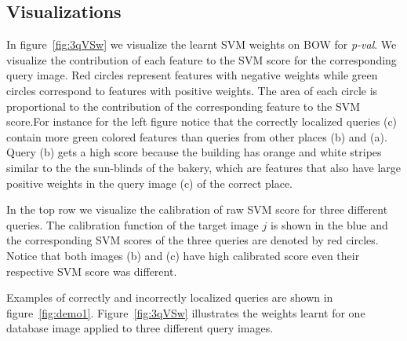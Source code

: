   \subsection{Visualizations}
    

    In figure~\ref{fig:3qVSw} we visualize the learnt SVM weights on BOW for \emph{p-val}. We visualize the contribution of each feature to the SVM score for the corresponding query image. Red circles represent features with negative weights while green circles correspond to features with positive weights. The area of each circle is proportional to the contribution of the corresponding feature to the SVM score.For instance for the left figure notice that the correctly localized queries (c) contain more green colored features than queries from other places (b) and (a). Query (b) gets a high score because the building has orange and white stripes similar to the the sun-blinds of the bakery, which are features that also have large positive weights in the query image (c) of the correct place.

    In the top row we visualize the calibration of raw SVM score for three different queries. The calibration function of the target image $j$ is shown in the blue and the corresponding SVM scores of the three queries are denoted by red circles. Notice that both images (b) and (c) have high calibrated score even their respective SVM score was different.

    Examples of correctly and incorrectly localized queries are shown in figure~\ref{fig:demo1}. Figure~\ref{fig:3qVSw} illustrates the weights learnt for one database image applied to three different query images.




